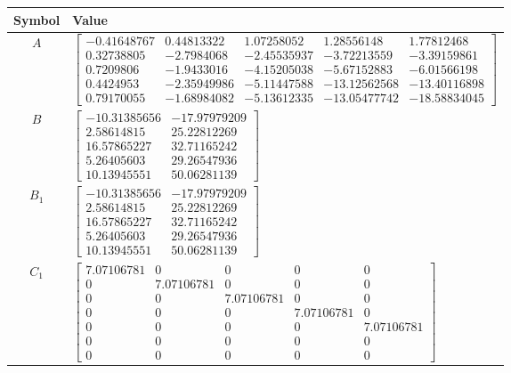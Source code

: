 \begin{tabular}{cl}
\hline
  Symbol  & Value                                                                                                                                                                                                                                                                                                                                                                                    \\
\hline
   $A$    & $\left[\begin{matrix}-0.41648767 & 0.44813322 & 1.07258052 & 1.28556148 & 1.77812468\\0.32738805 & -2.7984068 & -2.45535937 & -3.72213559 & -3.39159861\\0.7209806 & -1.9433016 & -4.15205038 & -5.67152883 & -6.01566198\\0.4424953 & -2.35949986 & -5.11447588 & -13.12562568 & -13.40116898\\0.79170055 & -1.68984082 & -5.13612335 & -13.05477742 & -18.58834045\end{matrix}\right]$ \\
   $B$    & $\left[\begin{matrix}-10.31385656 & -17.97979209\\2.58614815 & 25.22812269\\16.57865227 & 32.71165242\\5.26405603 & 29.26547936\\10.13945551 & 50.06281139\end{matrix}\right]$                                                                                                                                                                                                           \\
 $B_{1}$  & $\left[\begin{matrix}-10.31385656 & -17.97979209\\2.58614815 & 25.22812269\\16.57865227 & 32.71165242\\5.26405603 & 29.26547936\\10.13945551 & 50.06281139\end{matrix}\right]$                                                                                                                                                                                                           \\
 $C_{1}$  & $\left[\begin{matrix}7.07106781 & 0 & 0 & 0 & 0\\0 & 7.07106781 & 0 & 0 & 0\\0 & 0 & 7.07106781 & 0 & 0\\0 & 0 & 0 & 7.07106781 & 0\\0 & 0 & 0 & 0 & 7.07106781\\0 & 0 & 0 & 0 & 0\\0 & 0 & 0 & 0 & 0\end{matrix}\right]$                                                                                                                                                                \\

\end{tabular}
